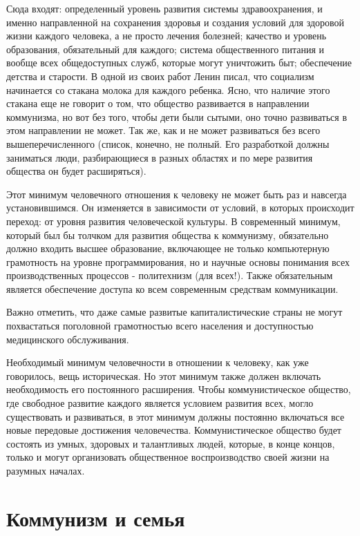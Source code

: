 \documentclass[12pt,a4paper,openany]{book}
\begin{document}
Сюда входят: определенный уровень развития системы здравоохранения, и именно направленной на сохранения здоровья и создания условий для здоровой жизни каждого человека, а не просто лечения болезней; качество и уровень образования, обязательный для каждого; система общественного питания и вообще всех общедоступных служб, которые могут уничтожить быт; обеспечение детства и старости. В одной из своих работ Ленин писал, что социализм начинается со стакана молока для каждого ребенка. Ясно, что наличие этого стакана еще не говорит о том, что общество развивается в направлении коммунизма, но вот без того, чтобы дети были сытыми, оно точно развиваться в этом направлении не может. Так же, как и не может развиваться без всего вышеперечисленного (список, конечно, не полный. Его разработкой должны заниматься люди, разбирающиеся в разных областях и по мере развития общества он будет расширяться).

Этот минимум человечного отношения к человеку не может быть раз и навсегда установившимся. Он изменяется в зависимости от условий, в которых происходит переход: от уровня развития человеческой культуры. В современный минимум, который был бы толчком для развития общества к коммунизму, обязательно должно входить высшее образование, включающее не только компьютерную грамотность на уровне программирования, но и научные основы понимания всех производственных процессов - политехнизм (для всех!). Также обязательным является обеспечение доступа ко всем современным средствам коммуникации.

Важно отметить, что даже самые развитые капиталистические страны не могут похвастаться поголовной грамотностью всего населения и доступностью медицинского обслуживания.

Необходимый минимум человечности в отношении к человеку, как уже говорилось, вещь историческая. Но этот минимум также должен включать необходимость его постоянного расширения. Чтобы коммунистическое общество, где свободное развитие каждого является условием развития всех, могло существовать и развиваться, в этот минимум должны постоянно включаться все новые передовые достижения человечества. Коммунистическое общество будет состоять из умных, здоровых и талантливых людей, которые, в конце концов, только и могут организовать общественное воспроизводство своей жизни на разумных началах.
\ifSubfilesClassLoaded{\setcounter{page}{50}}{}
\section{Коммунизм и семья}
\label{sec:09_kommunizm_semya}
\end{document}
